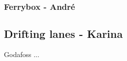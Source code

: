 \documentclass[12pt,a4paper,english]{article}
\begin{document}

\subsubsection{Ferrybox - Andr\'{e}}

\subsection{Drifting lanes - Karina}
Godafoss ...
\end{document}
